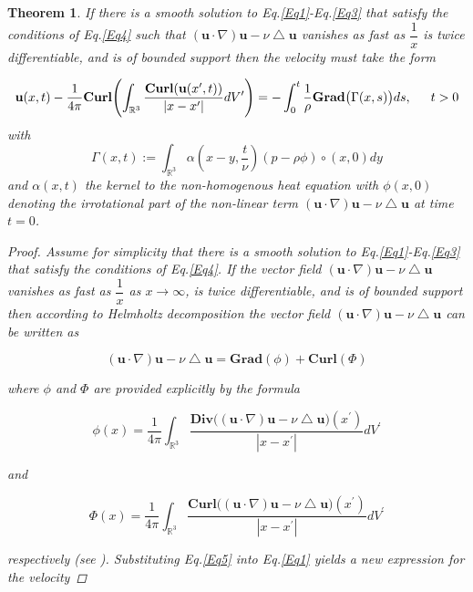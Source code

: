 \documentclass[amsmath,12pt,a4paper]{amsart}
\newtheorem{theorem}{Theorem}
\begin{document}
\begin{theorem}\label{Thm1}
If there is a smooth solution to Eq.\eqref{Eq1}-Eq.\eqref{Eq3} that satisfy the conditions of Eq.\eqref{Eq4} such that $\left(\textbf{u}\cdot \nabla \right)\textbf{u} -    \nu \bigtriangleup \textbf{u}$ vanishes as fast as $\dfrac{1}{x}$ is twice differentiable, and is of bounded support then the velocity must take the form

$$ \textbf{u}(x,t)- \dfrac{1}{4\pi}\textbf{Curl}\Biggl( \int_{\mathbb{R}^3}^{}{\dfrac{\textbf{Curl} (\textbf{u} (x^\prime,t))}{|x-x^\prime|}}dV^\prime\Biggr) = -\int_{0}^{t}{\dfrac{1}{\rho}  \textbf{Grad}\big(\Gamma(x,s)\big)}ds, \indent t>0$$ with $$\Gamma(x,t):=\int_{\mathbb{R}^3}^{}{\alpha(x-y,\dfrac{t}{\nu})(p - \rho \phi)\circ(x,0)}dy$$ and $\alpha(x,t)$ the kernel to the non-homogenous heat equation with  $\phi(x,0)$ denoting the irrotational part of the non-linear term $\left(\textbf{u}\cdot \nabla \right)\textbf{u} -    \nu \bigtriangleup \textbf{u}$ at time $t=0$. 

\begin{proof}
 Assume for simplicity that there is a smooth solution to Eq.\eqref{Eq1}-Eq.\eqref{Eq3} that satisfy the conditions of Eq.\eqref{Eq4}. If the vector field $\left(\textbf{u}\cdot \nabla \right)\textbf{u} -    \nu \bigtriangleup \textbf{u}$ vanishes as fast as $\dfrac{1}{x}$ as $x\rightarrow \infty$, is twice differentiable, and is of bounded support then according to Helmholtz decomposition the vector field $\left(\textbf{u}\cdot \nabla \right)\textbf{u} -    \nu \bigtriangleup \textbf{u}$ can be written as 

\begin{equation}\label{Eq5}
\left(\textbf{u}\cdot \nabla \right)\textbf{u} -    \nu \bigtriangleup \textbf{u}= \textbf{Grad}(\phi) + \textbf{Curl}(\Phi)
\end{equation}


where $\phi$ and $\Phi$ are provided explicitly by the formula
 
$$
\phi(x) = \dfrac{1}{4\pi}\int_{\mathbb{R}^3}^{}{\dfrac{\textbf{Div}\bigl(\left(\textbf{u}\cdot \nabla \right)\textbf{u} -    \nu \bigtriangleup \textbf{u}\bigr)(x^\prime)}{|x-x^\prime|}}dV^\prime
$$ 

and 

$$ 
\Phi(x) = \dfrac{1}{4\pi}\int_{\mathbb{R}^3}^{}{\dfrac{\textbf{Curl}\bigl(\left(\textbf{u}\cdot \nabla \right)\textbf{u} -    \nu \bigtriangleup \textbf{u}\bigr)(x^\prime)}{|x-x^\prime|}}dV^\prime
$$ 

respectively (see \cite{Griffiths1999}). Substituting Eq.\eqref{Eq5} into Eq.\eqref{Eq1} yields a new expression for the velocity



\end{proof}
\end{theorem}
\end{document}
